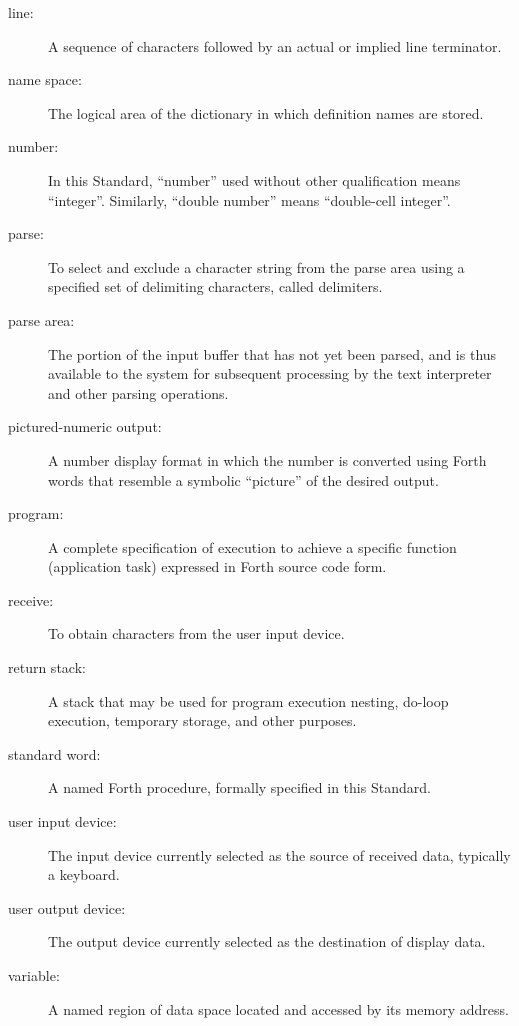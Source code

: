 \begin{description}
\item[line:]
	A sequence of characters followed by an actual or implied line
	terminator.

\item[name space:]
	The logical area of the dictionary in which definition names are
	stored.

\item[number:]
	In this Standard, ``number'' used without other qualification means
	``integer''. Similarly, ``double number'' means ``double-cell
	integer''.

\item[parse:]
	To select and exclude a character string from the parse area using
	a specified set of delimiting characters, called delimiters.

\item[parse area:]
	The portion of the input buffer that has not yet been parsed, and
	is thus available to the system for subsequent processing by the
	text interpreter and other parsing operations.

\item[pictured-numeric output:]
	A number display format in which the number is converted using
	Forth words that resemble a symbolic ``picture'' of the desired
	output.

\item[program:]
	A complete specification of execution to achieve a specific
	function (application task) expressed in Forth source code form.

\item[receive:]
	To obtain characters from the user input device.

\item[return stack:]
	A stack that may be used for program execution nesting, do-loop
	execution, temporary storage, and other purposes.

\item[standard word:]
	A named Forth procedure, formally specified in this Standard.

\item[user input device:]
	The input device currently selected as the source of received
	data, typically a keyboard.

\item[user output device:]
	The output device currently selected as the destination of
	display data.

\item[variable:]
	A named region of data space located and accessed by its memory
	address.


\end{description}
